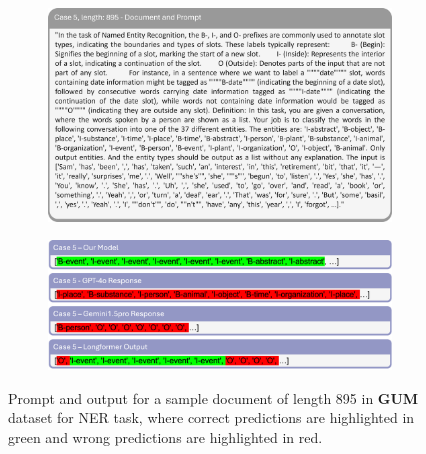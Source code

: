 \documentclass[11pt]{article}
\begin{document}
\begin{figure}[!h]
    \centering
    \begin{subfigure}[b]{1.0\linewidth}   
        \includegraphics[width=\textwidth]{images/case5_prompt.png} 
    \end{subfigure}
    \vspace{1pt}
    \begin{subfigure}[b]{1.0\linewidth}  
        \includegraphics[width=\textwidth]{images/case5_ans.png}
    \end{subfigure}
    \caption{Prompt and output for a sample document of length 895 in \textbf{GUM} dataset for NER task, where correct predictions are highlighted in green and wrong predictions are highlighted in red.}
    \label{case5}
\end{figure}
\end{document}
